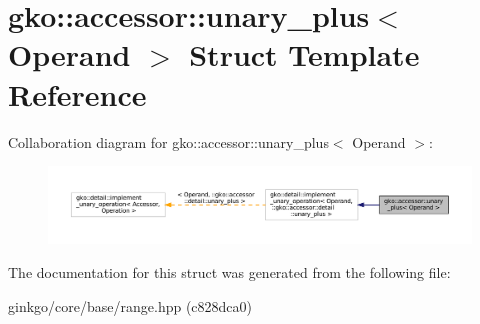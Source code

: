 \hypertarget{structgko_1_1accessor_1_1unary__plus}{}\section{gko\+:\+:accessor\+:\+:unary\+\_\+plus$<$ Operand $>$ Struct Template Reference}
\label{structgko_1_1accessor_1_1unary__plus}


Collaboration diagram for gko\+:\+:accessor\+:\+:unary\+\_\+plus$<$ Operand $>$\+:
\nopagebreak
\begin{figure}[H]
\begin{center}
\leavevmode
\includegraphics[width=350pt]{structgko_1_1accessor_1_1unary__plus__coll__graph}
\end{center}
\end{figure}


The documentation for this struct was generated from the following file\+:\begin{DoxyCompactItemize}
\item 
ginkgo/core/base/range.\+hpp (c828dca0)\end{DoxyCompactItemize}
